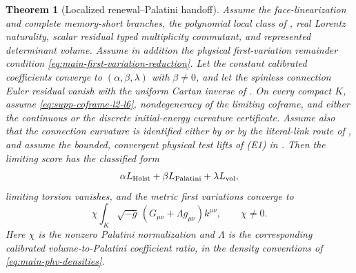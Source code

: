 \documentclass[11pt]{article}
\newtheorem{theorem}{Theorem}[section]
\numberwithin{equation}{section}
\theoremstyle{definition}
\theoremstyle{remark}
\begin{document}
\begin{theorem}[Localized renewal--Palatini handoff]
\label{thm:supp-renewal-palatini}
Assume the face-linearization and complete memory-short branches, the
polynomial local class of , real Lorentz
naturality, scalar residual typed multiplicity commutant, and represented
determinant volume. Assume in addition the physical first-variation
remainder condition \eqref{eq:main-first-variation-reduction}.  Let the constant calibrated coefficients
converge to $(\alpha,\beta,\lambda)$ with $\beta\ne0$, and let the spinless
connection Euler residual vanish with the uniform Cartan inverse of
.  On every compact $K$, assume
\eqref{eq:supp-coframe-l2-l6}, nondegeneracy of the limiting coframe, and either
the continuous or the discrete initial-energy curvature certificate.
Assume also that the connection curvature is identified either by
 or by the literal-link route of
, and assume the bounded, convergent
physical test lifts of \textup{(E1)} in .
Then the limiting score has the classified form
\begin{equation}
 \alpha L_{\rm Holst}+\beta L_{\rm Palatini}+\lambda L_{\rm vol},
 \label{eq:supp-phv-classification}
\end{equation}
limiting torsion vanishes, and the metric first variations converge to
\begin{equation}
 \chi\int_K\sqrt{-g}\,
       (G_{\mu\nu}+\Lambda g_{\mu\nu})k^{\mu\nu},\qquad\chi\ne0.
 \label{eq:supp-einstein-insertion}
\end{equation}
Here $\chi$ is the nonzero Palatini normalization and $\Lambda$ is the
corresponding calibrated volume-to-Palatini coefficient ratio, in the density
conventions of \eqref{eq:main-phv-densities}.
\end{theorem}
\end{document}
